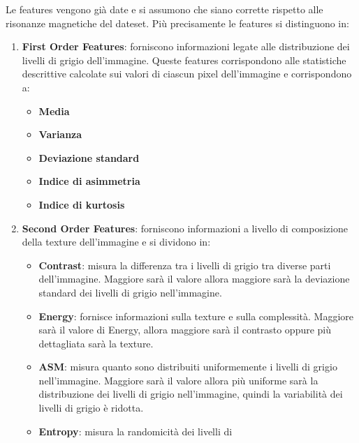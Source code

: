 Le features vengono già date e si assumono che siano corrette rispetto alle
risonanze magnetiche del dateset\cite{explanation-features}. Più precisamente
le features si distinguono in:
\begin{enumerate}
      \item \textbf{First Order Features}: forniscono informazioni legate alle
            distribuzione dei livelli di grigio dell'immagine. Queste features
            corrispondono alle statistiche descrittive calcolate sui valori di
            ciascun pixel dell'immagine e corrispondono a:
            \begin{itemize}
                  \item \textbf{Media}
                  \item \textbf{Varianza}
                  \item \textbf{Deviazione standard}
                  \item \textbf{Indice di asimmetria}
                  \item \textbf{Indice di kurtosis}
            \end{itemize}
      \item \textbf{Second Order Features}: forniscono informazioni a livello di
            composizione della texture dell'immagine e si dividono in:
            \begin{itemize}
                  \item \textbf{Contrast}: misura la differenza tra i livelli di
                        grigio tra diverse parti dell'immagine. Maggiore sarà il
                        valore allora maggiore sarà la deviazione standard dei
                        livelli di grigio nell'immagine.
                  \item \textbf{Energy}: fornisce informazioni sulla texture e
                        sulla complessità. Maggiore sarà il valore di Energy,
                        allora maggiore sarà il contrasto oppure più dettagliata
                        sarà la texture.
                  \item \textbf{ASM}: misura quanto sono distribuiti uniformemente
                        i livelli di grigio nell'immagine. Maggiore sarà il valore
                        allora più uniforme sarà la distribuzione dei livelli di
                        grigio nell'immagine, quindi la variabilità dei livelli
                        di grigio è ridotta.
                  \item \textbf{Entropy}: misura la randomicità dei livelli di

\end{itemize}
\end{enumerate}
